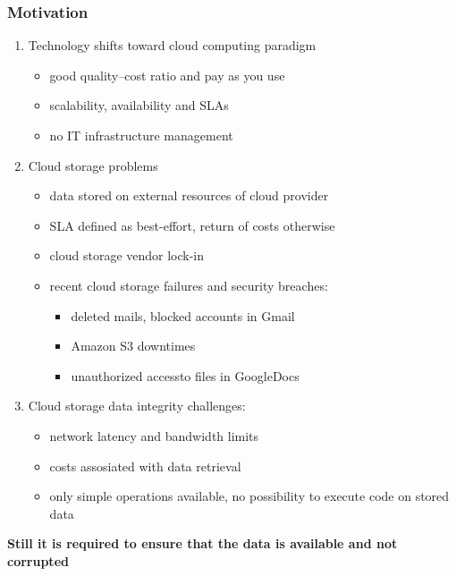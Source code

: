 \documentclass[9pt]{beamer}
\begin{document}

\begin{frame}
\frametitle{\hspace{5mm} \textbf{Motivation}}
\begin{block}{}
\begin{enumerate}
	\item Technology shifts toward cloud computing paradigm
	\begin{itemize}
		\item good quality--cost ratio and pay as you use
		\item scalability, availability and SLAs
		\item no IT infrastructure management
	\end{itemize}
	\item Cloud storage problems
	\begin{itemize}
		\item data stored on external resources of cloud provider
		\item SLA defined as best-effort, return of costs otherwise
		\item cloud storage vendor lock-in
		\item recent cloud storage failures and security breaches: 
		\begin{itemize}
			\item deleted mails, blocked accounts in Gmail
			\item Amazon S3 downtimes
			\item unauthorized accessto files in GoogleDocs
		\end{itemize}
	\end{itemize}
	\item Cloud storage data integrity challenges:
	\begin{itemize}
		\item network latency and bandwidth limits
		\item costs assosiated with data retrieval
		\item only simple operations available, no possibility to execute code on stored data
	\end{itemize}
\end{enumerate}
\textbf{Still it is required to ensure that the data is available and not corrupted}
\end{block}
\end{frame}

\end{document}
